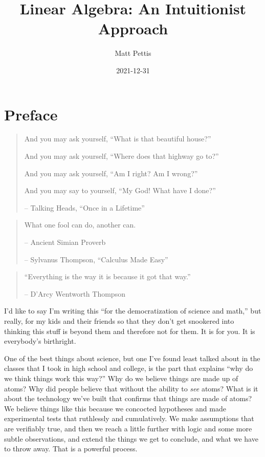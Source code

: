\documentclass[
]{book}
\title{Linear Algebra: An Intuitionist Approach}
\author{Matt Pettis}
\date{2021-12-31}
\begin{document}
\maketitle

{
\setcounter{tocdepth}{1}
\tableofcontents
}
\hypertarget{preface}{%
\chapter{Preface}\label{preface}}

\begin{quote}
And you may ask yourself, ``What is that beautiful house?''

And you may ask yourself, ``Where does that highway go to?''

And you may ask yourself, ``Am I right? Am I wrong?''

And you may say to yourself, ``My God! What have I done?''

-- Talking Heads, ``Once in a Lifetime''
\end{quote}

\begin{quote}
What one fool can do, another can.

-- Ancient Simian Proverb

-- Sylvanus Thompson, ``Calculus Made Easy''
\end{quote}

\begin{quote}
``Everything is the way it is because it got that way.''

-- D'Arcy Wentworth Thompson
\end{quote}

I'd like to say I'm writing this ``for the democratization of science and math,'' but really, for my kids and their friends so that they don't get snookered into thinking this stuff is beyond them and therefore not for them. It is for you. It is everybody's birthright.

One of the best things about science, but one I've found least talked about in the classes that I took in high school and college, is the part that explains ``why do we think things work this way?'' Why do we believe things are made up of atoms? Why did people believe that without the ability to \emph{see} atoms? What is it about the technology we've built that confirms that things are made of atoms? We believe things like this because we concocted hypotheses and made experimental tests that ruthlessly and cumulatively. We make assumptions that are verifiably true, and then we reach a little further with logic and some more subtle observations, and extend the things we get to conclude, and what we have to throw away. That is a powerful process.
\end{document}

